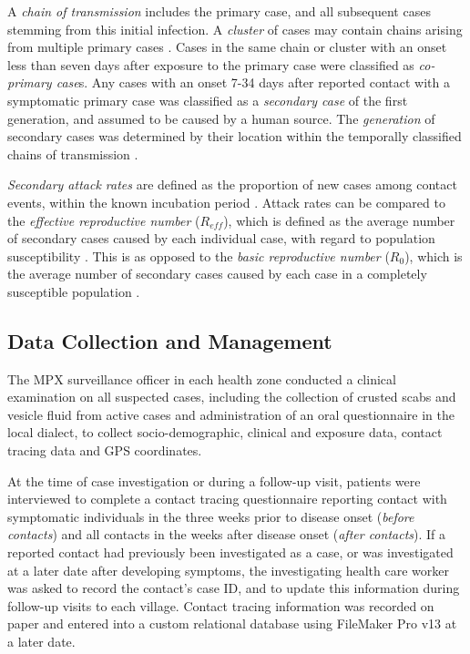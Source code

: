 A \textit{chain of transmission} includes the primary case, and all subsequent cases stemming from this initial infection. A \textit{cluster} of cases may contain chains arising from multiple primary cases \cite{Blumberg2014}. Cases in the same chain or cluster with an onset less than seven days after exposure to the primary case were classified as \textit{co-primary case}s. Any cases with an onset 7-34 days after reported contact with a symptomatic primary case was classified as a \textit{secondary case} of the first generation, and assumed to be caused by a human source. The \textit{generation} of secondary cases was determined by their location within the temporally classified chains of transmission \cite{Blumberg2014}.

\textit{Secondary attack rates} are defined as the proportion of new cases among contact events, within the known incubation period \cite{Dixon2015}. Attack rates can be compared to the \textit{effective reproductive number} ($R_{eff}$), which is defined as the average number of secondary cases caused by each individual case, with regard to population susceptibility \cite{Jezek1986, Jezek1988}. This is as opposed to the \textit{basic reproductive number} ($R_{0}$), which is the average number of secondary cases caused by each case in a completely susceptible population \cite{Blumberg2014}.

\subsection{Data Collection and Management}
The MPX surveillance officer in each health zone conducted a clinical examination on all suspected cases,
including the collection of crusted scabs and vesicle fluid from active cases and administration of an oral questionnaire in the local dialect, to collect socio-demographic, clinical and exposure data, contact tracing data and GPS coordinates.

At the time of case investigation or during a follow-up visit, patients were interviewed to complete a contact tracing questionnaire reporting contact with symptomatic individuals in the three weeks prior to disease onset  (\textit{before contacts}) and all contacts in the weeks after disease onset (\textit{after contacts}). If a reported contact had previously been investigated as a case, or was investigated at a later date after developing symptoms, the investigating health care worker was asked to record the contact's case ID, and to update this information during follow-up visits to each village. Contact tracing information was recorded on paper and entered into a custom relational database using FileMaker Pro v13 at a later date.

